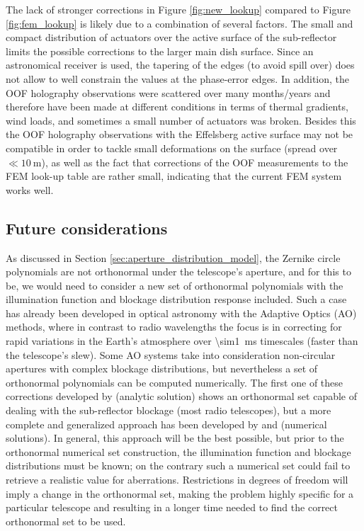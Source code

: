 \documentclass[
    ]
    {aa}
\begin{document}
    The lack of stronger corrections in Figure \ref{fig:new_lookup} compared to Figure \ref{fig:fem_lookup} is likely due to a combination of several factors. The small and compact distribution of actuators over the active surface of the sub-reflector limits the possible corrections to the larger main dish surface. Since an astronomical receiver is used, the tapering of the edges (to avoid spill over) does not allow to well constrain the values at the phase-error edges. In addition, the OOF holography observations were scattered over many months/years and therefore have been made at different conditions in terms of thermal gradients, wind loads, and sometimes a small number of actuators was broken. Besides this the OOF holography observations with the Effelsberg active surface may not be compatible in order to tackle small deformations on the surface (spread over $\ll\SI{10}{\m}$), as well as the fact that corrections of the OOF measurements to the FEM look-up table are rather small, indicating that the current FEM system works well.

    \subsection{Future considerations}
    As discussed in Section \ref{sec:aperture_distribution_model}, the Zernike circle polynomials are not orthonormal under the telescope's aperture, and for this to be, we would need to consider a new set of orthonormal polynomials with the illumination function and blockage distribution response included. Such a case has already been developed in optical astronomy with the Adaptive Optics (AO) methods, where in contrast to radio wavelengths the focus is in correcting for rapid variations in the Earth's atmosphere over \SI{\sim1}{\milli\s} timescales (faster than the telescope's slew). Some AO systems take into consideration non-circular apertures with complex blockage distributions, but nevertheless a set of orthonormal polynomials can be computed numerically. The first one of these corrections developed by \citet{1984JOSAA...1..685M} (analytic solution) shows an orthonormal set capable of dealing with the sub-reflector blockage (most radio telescopes), but a more complete and generalized approach has been developed by \citet{1994ApOpt..33.1832S} and \citet{2004OptL...29.2840U} (numerical solutions). In general, this approach will be the best possible, but prior to the orthonormal numerical set construction, the illumination function and blockage distributions must be known; on the contrary such a numerical set could fail to retrieve a realistic value for aberrations. Restrictions in degrees of freedom will imply a change in the orthonormal set, making the problem highly specific for a particular telescope and resulting in a longer time needed to find the correct orthonormal set to be used.
\end{document}
